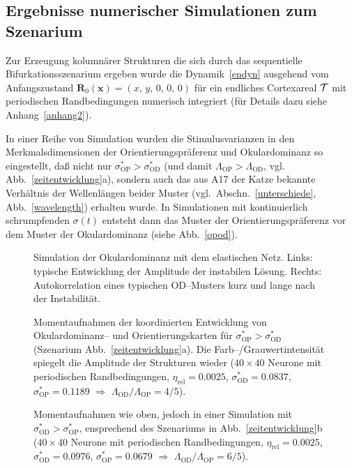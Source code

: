 \subsection{Ergebnisse numerischer Simulationen zum Szenarium}
\label{numerg}

Zur Erzeugung kolumnärer Strukturen die sich durch das sequentielle
Bifurkationsszenarium ergeben wurde die Dynamik~\eqref{endyn} ausgehend vom
Anfangszustand $\mathbf{R}_0(\mathbf{x}) = (x,\, y,\, 0,\, 0,\, 0) $ für
ein endliches Cortexareal $\cal T$ mit periodischen Randbedingungen
numerisch integriert (für Details dazu siehe Anhang~\ref{anhang2}).

In einer Reihe von  Simulation  wurden die Stimulusvarianzen in den
Merkmalsdimensionen der Orientierungspräferenz und Okulardominanz  so
eingestellt, daß nicht nur $\sigma^\ast_{\text{OP}}>\sigma^\ast_{\text{OD}}$
(und damit $\Lambda_{\text{OP}} > \Lambda_{\text{OD}}$,
vgl. Abb.~\ref{zeitentwicklung}a), sondern auch
das aus A17 der Katze bekannte Verhältnis der Wellenlängen beider
Muster (vgl.~Abschn.~\ref{unterschiede}, Abb.~\ref{wavelength})
erhalten wurde.  In Simulationen mit kontinuierlich schrumpfenden
$\sigma(t)$ entsteht dann das Muster der Orientierungspräferenz vor dem
Muster der Okulardominanz (siehe Abb.~\ref{opod}).

\begin{figure}[h!]
\centering
{}
\caption{Simulation der Okulardominanz mit dem elastischen Netz. Links:
typische Entwicklung der Amplitude der instabilen Lösung. Rechts:
Autokorrelation eines typischen OD--Musters kurz und lange nach der
Instabilität.}
\label{umordnung}
\end{figure}


\begin{figure}[p]
\centering
\begin{sideways}
\end{sideways}
\caption{Momentaufnahmen der koordinierten Entwicklung von Okular\-do\-minanz--
und Orientierungskarten für
$\sigma^\ast_{\text{OP}}>\sigma^\ast_{\text{OD}}$ (Szenarium
Abb.~\ref{zeitentwicklung}a). Die Farb--/Grauwertintensität spiegelt
die Amplitude der Strukturen wieder ($40\times 40$ Neurone mit periodischen
Randbedingungen, $\eta_{\text{rel}}=0.0025$,
$\sigma^\ast_{\text{OD}}=0.0837$, $\sigma^\ast_{\text{OP}}=0.1189$
$\Longrightarrow$ $\Lambda_{\text{OD}}/\Lambda_{\text{OP}}=4/5$).}
\label{opod}

\begin{center}
\begin{sideways}
\end{sideways}
\end{center}
\caption{Momentaufnahmen wie oben, jedoch in einer Simulation mit
$\sigma^\ast_{\text{OD}}>\sigma^\ast_{\text{OP}}$, ensprechend des Szenariums in
Abb.~\ref{zeitentwicklung}b ($40\times 40$ Neurone mit
periodischen Randbedingungen, $\eta_{\text{rel}}= 0.0025$,
$\sigma^\ast_{\text{OD}}=0.0976$, $\sigma^\ast_{\text{OP}}=0.0679$
$\Longrightarrow$ $\Lambda_{\text{OD}}/\Lambda_{\text{OP}}=6/5$).}
\label{odop}
\end{figure}


